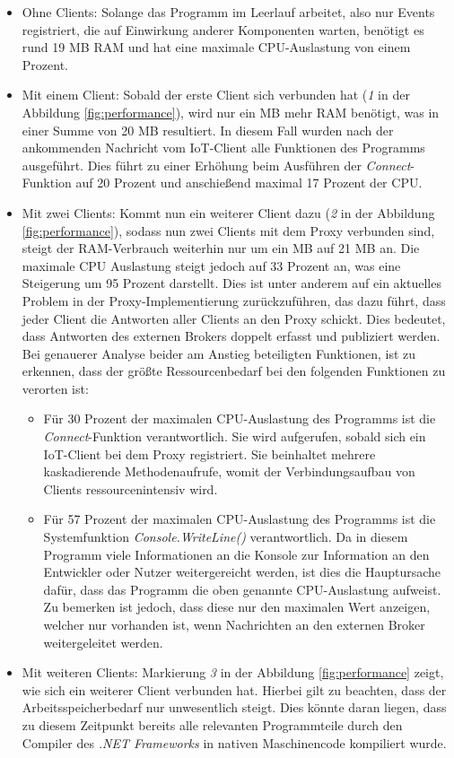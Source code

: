     \begin{itemize}
        \item Ohne Clients:
        Solange das Programm im Leerlauf arbeitet, also nur Events registriert, die auf Einwirkung anderer Komponenten warten, benötigt es rund 19 \ac{MB} \ac{RAM} und hat eine maximale \ac{CPU}-Auslastung von einem Prozent.
        \item Mit einem Client:
        Sobald der erste Client sich verbunden hat (\emph{1} in der Abbildung \ref{fig:performance}), wird nur ein \ac{MB} mehr \ac{RAM} benötigt, was in einer Summe von 20 \ac{MB} resultiert. In diesem Fall wurden nach der ankommenden Nachricht vom \ac{IoT}-Client alle Funktionen des Programms ausgeführt. Dies führt zu einer Erhöhung beim Ausführen der \emph{Connect}-Funktion auf 20 Prozent und anschießend maximal 17 Prozent der \ac{CPU}.
        \item Mit zwei Clients:
        Kommt nun ein weiterer Client dazu (\emph{2} in der Abbildung \ref{fig:performance}), sodass nun zwei Clients mit dem Proxy verbunden sind, steigt der \ac{RAM}-Verbrauch weiterhin nur um ein \ac{MB} auf 21 \ac{MB} an. Die maximale \ac{CPU} Auslastung steigt jedoch auf 33 Prozent an, was eine Steigerung um 95 Prozent darstellt. Dies ist unter anderem auf ein aktuelles Problem in der Proxy-Implementierung %
        zurückzuführen, das dazu führt, dass jeder Client die Antworten aller Clients an den Proxy schickt. Dies bedeutet, dass Antworten des externen Brokers doppelt erfasst und publiziert werden.
        Bei genauerer Analyse beider am Anstieg beteiligten Funktionen, ist zu erkennen, dass der größte Ressourcenbedarf bei den folgenden Funktionen zu verorten ist:
        \begin{itemize}
            \item Für 30 Prozent der maximalen \ac{CPU}-Auslastung des Programms ist die \emph{Connect}-Funktion verantwortlich. Sie wird aufgerufen, sobald sich ein \ac{IoT}-Client bei dem Proxy registriert. Sie beinhaltet mehrere kaskadierende Methodenaufrufe, womit der Verbindungsaufbau von Clients ressourcenintensiv wird.  
            \item Für 57 Prozent der maximalen \ac{CPU}-Auslastung des Programms ist die Systemfunktion \emph{Console.WriteLine()} verantwortlich. Da in diesem Programm viele Informationen an die Konsole zur Information an den Entwickler oder Nutzer weitergereicht werden, ist dies die Hauptursache dafür, dass das Programm die oben genannte \ac{CPU}-Auslastung aufweist. Zu bemerken ist jedoch, dass diese nur den maximalen Wert anzeigen, welcher nur vorhanden ist, wenn Nachrichten an den externen Broker weitergeleitet werden.
        \end{itemize}
        \item Mit weiteren Clients:
        Markierung \emph{3} in der Abbildung \ref{fig:performance} zeigt, wie sich ein weiterer Client verbunden hat. Hierbei gilt zu beachten, dass der Arbeitsspeicherbedarf nur unwesentlich steigt. Dies könnte daran liegen, dass zu diesem Zeitpunkt bereits alle relevanten Programmteile durch den Compiler des \emph{.NET Frameworks} in nativen Maschinencode kompiliert wurde.
    \end{itemize}
